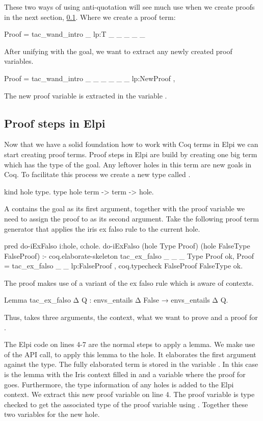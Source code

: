 \documentclass[thesis.tex]{subfiles}
\begin{document}
{{{{These two ways of using anti-quotation will see much use when we create proofs in the next section, \cref{ssec:proofselpi}. Where we create a proof term:
\begin{elpicode}
  Proof = {{ tac_wand_intro _ lp:T _ _ _ _ _ }} 
\end{elpicode}
After unifying  with the goal, we want to extract any newly created proof variables.
\begin{elpicode}[firstnumber=3]
  Proof = {{ tac_wand_intro _ _ _ _ _ _ lp:NewProof }}, 
\end{elpicode}
The new proof variable is extracted in the variable .

\subsection{Proof steps in Elpi}\label{ssec:proofselpi}
Now that we have a solid foundation how to work with Coq terms in Elpi we can start creating proof terms. Proof steps in Elpi are build by creating one big term which has the type of the goal. Any leftover holes in this term are new goals in Coq. To facilitate this process we create a new type called .
\begin{elpicode}
  kind hole type.
  type hole term -> term -> hole. 
\end{elpicode}
A  contains the goal as its first argument, together with the proof variable we need to assign the proof to as its second argument. Take the following proof term generator that applies the iris ex falso rule to the current hole.
\begin{elpicode}
  pred do-iExFalso i:hole, o:hole.
  do-iExFalso (hole Type Proof) 
              (hole FalseType FalseProof) :-
    coq.elaborate-skeleton 
      {{ tac_ex_falso _ _ _ }} Type Proof ok,
    Proof = {{ tac_ex_falso _ _ lp:FalseProof }},
    coq.typecheck FalseProof FalseType ok.
\end{elpicode}
The proof makes use of a variant of the ex falso rule which is aware of contexts.
\begin{coqcode}
  Lemma tac_ex_falso Δ Q : 
    envs_entails Δ False → 
    envs_entails Δ Q.
\end{coqcode}
Thus,  takes three arguments, the context, what we want to prove and a proof for .

The Elpi code on lines 4-7 are the normal steps to apply a lemma. We make use of the \ce API call,  to apply this lemma to the hole. It elaborates the first argument against the type. The fully elaborated term is stored in the variable . In this case  is the lemma with the Iris context filled in and a variable where the proof for  goes. Furthermore, the type information of any holes is added to the Elpi context. We extract this new proof variable on line 4. The proof variable is type checked to get the associated type of the proof variable using . Together these two variables for the new hole.

}}}}
\end{document}
